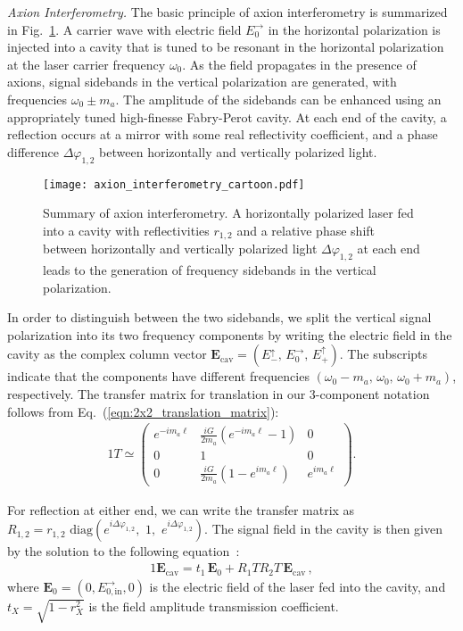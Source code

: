 \documentclass[aps,prd,nofootinbib,twocolumn,superscriptaddress,preprintnumbers,letterpaper, longbibliography]{revtex4-1}
\def\polarc{horizontal }
\def\polars{vertical }
\def\polarcly{horizontally }
\def\Ec{E_0^\rightarrow}
\def\Ep{E_+^\uparrow}
\def\Em{E_-^\uparrow}
\def\Ein{E_{0,\text{in}}^\rightarrow}
\begin{document}
\textit{Axion Interferometry.} The basic principle of axion interferometry is summarized in Fig.~\ref{fig:axion_interferometry_cartoon}. A carrier wave with electric field $\Ec$ in the \polarc polarization is injected into a cavity that is tuned to be resonant in the \polarc polarization at the laser carrier frequency $\omega_0$. As the field propagates in the presence of axions, signal sidebands in the \polars polarization are generated, with frequencies $\omega_0 \pm m_a$. The amplitude of the sidebands can be enhanced using an appropriately tuned high-finesse Fabry-Perot cavity. At each end of the cavity, a reflection occurs at a mirror with some real reflectivity coefficient, and a phase difference $\Delta \varphi_{1,2}$ between horizontally and vertically polarized light.
%
\begin{figure}
    \centering
    \texttt{[image: axion\_interferometry\_cartoon.pdf]}
    \caption{Summary of axion interferometry. A \polarcly polarized laser fed into a cavity with reflectivities $r_{1,2}$ and a relative phase shift between horizontally and vertically polarized light $\Delta \varphi_{1,2}$ at each end leads to the generation of frequency sidebands in the \polars polarization.}
    \label{fig:axion_interferometry_cartoon}
\end{figure}
%

In order to distinguish between the two sidebands, we split the \polars signal polarization into its two frequency components by writing the electric field in the cavity as the complex column vector $\mathbf{E}_\text{cav} = (\Em,\, \Ec,\, \Ep)$. The subscripts indicate that the components have different frequencies $(\omega_0 - m_a,\, \omega_0,\, \omega_0 + m_a)$, respectively. The transfer matrix for translation in our 3-component notation follows from Eq.~(\ref{eqn:2x2_translation_matrix}):
%
\begin{alignat}{1}
    T \simeq \begin{pmatrix}
        e^{-i m_a \ell} & \frac{iG}{2m_a}(e^{-i m_a \ell} - 1) & 0 \\
        0 & 1 & 0 \\
        0 & \frac{iG}{2m_a} (1 - e^{i m_a \ell}) & e^{i m_a \ell}
    \end{pmatrix}.
    \label{eqn:3x3_translation_matrix}
\end{alignat}
%
%

For reflection at either end, we can write the transfer matrix as $R_{1,2} = r_{1,2} \, \, \text{diag} \left(e^{i \Delta \varphi_{1,2}},\,\, 1,\,\, e^{i \Delta \varphi_{1,2}} \right)$. The signal field in the cavity is then given by the solution to the following equation~\cite{Maggiore:1900zz}:
%
\begin{alignat}{1}
    \mathbf{E}_\text{cav} = t_1\, \mathbf{E}_0 + R_1 T R_2 T \, \mathbf{E}_\text{cav} \,,
    \label{eqn:E_cav}
\end{alignat}
%
where $\mathbf{E}_0 = (0, \Ein, 0)$ is the electric field of the laser fed into the cavity, and $t_X = \sqrt{1 - r_X^2}$ is the field amplitude transmission coefficient. 
\end{document}
